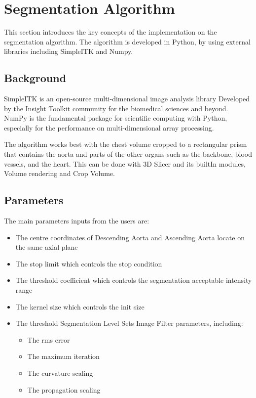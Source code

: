 \section{Segmentation Algorithm}

This section introduces the key concepts of the implementation on the segmentation algorithm. The algorithm is developed in Python, by using external libraries including SimpleITK and Numpy. 

\subsection{Background}

SimpleITK is an open-source multi-dimensional image analysis library Developed by the Insight Toolkit community for the biomedical sciences and beyond. NumPy is the fundamental package for scientific computing with Python, especially for the performance on multi-dimensional array processing.

The algorithm works best with the chest volume cropped to a rectangular prism that contains the aorta and parts of the other organs such as the backbone, blood vessels, and the heart. This can be done with 3D Slicer and its builtIn modules, Volume rendering and Crop Volume.

\subsection{Parameters}
The main parameters inputs from the users are:
\begin{itemize}
\item The centre coordinates of Descending Aorta and Ascending Aorta locate on the same axial plane
\item The stop limit which controls the stop condition
\item The threshold coefficient which controls the segmentation acceptable intensity range
\item The kernel size which controls the init size 
\item The threshold Segmentation Level Sets Image Filter parameters, including:
\begin{itemize}
\item The rms error
\item The maximum iteration
\item The curvature scaling
\item The propagation scaling
\end{itemize}
\end{itemize}




